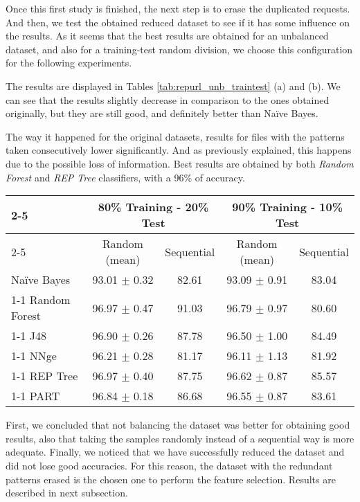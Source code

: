 \documentclass{llncs}
\begin{document}
Once this first study is finished, the next step is to erase the duplicated requests. And then, we test the obtained reduced dataset to see if it has some influence on the results. As it seems that the best results are obtained for an unbalanced dataset, and also for a training-test random division, we choose this configuration for the following experiments.

The results are displayed in Tables \ref{tab:repurl_unb_traintest} (a) and (b). We can see that the results slightly decrease in comparison to the ones obtained originally, but they are still good, and definitely better than Na\"ive Bayes.

The way it happened for the original datasets, results for files with the patterns taken consecutively lower significantly. And as previously explained, this happens due to the possible loss of information. Best results are obtained by both \textit{Random Forest} and \textit{REP Tree} classifiers, with a 96\% of accuracy.

\begin{table*}[htpb]
\centering
 \caption{\label{tab:repurl_unb_traintest}Percentage of correctly classified patterns for unbalanced data, after the removal of entries that could lead to misclassification.}
{\small
\begin{tabular}{|l|c|c|c|c|}
\cline{2-5}
\multicolumn{1}{l|}{} & \multicolumn{2}{c|}{80\% Training - 20\% Test} & \multicolumn{2}{c|}{90\% Training - 10\% Test} \\
\cline{2-5}
\multicolumn{1}{l|}{} & Random (mean) & Sequential & Random (mean) & Sequential \\
\hline
Na\"ive Bayes & 93.01 $\pm$ 0.32 & 82.61 & 93.09 $\pm$ 0.91 & 83.04 \\
\cline{1-1}
Random Forest & 96.97 $\pm$ 0.47 & 91.03 & 96.79 $\pm$ 0.97 & 80.60 \\
\cline{1-1}
J48 & 96.90 $\pm$ 0.26 & 87.78 & 96.50 $\pm$ 1.00 & 84.49 \\
\cline{1-1}
NNge & 96.21 $\pm$ 0.28 & 81.17 & 96.11 $\pm$ 1.13 & 81.92 \\
\cline{1-1}
REP Tree & 96.97 $\pm$ 0.40 & 87.75 & 96.62 $\pm$ 0.87 & 85.57 \\
\cline{1-1}
PART & 96.84 $\pm$ 0.18 & 86.68 & 96.55 $\pm$ 0.87 & 83.61 \\
\hline
\end{tabular}
}
\end{table*}

First, we concluded that not balancing the dataset was better for obtaining good results, also that taking the samples randomly instead of a sequential way is more adequate. Finally, we noticed that we have successfully reduced the dataset and did not lose good accuracies. For this reason, the dataset with the redundant patterns erased is the chosen one to perform the feature selection. Results are described in next subsection.
\end{document}
